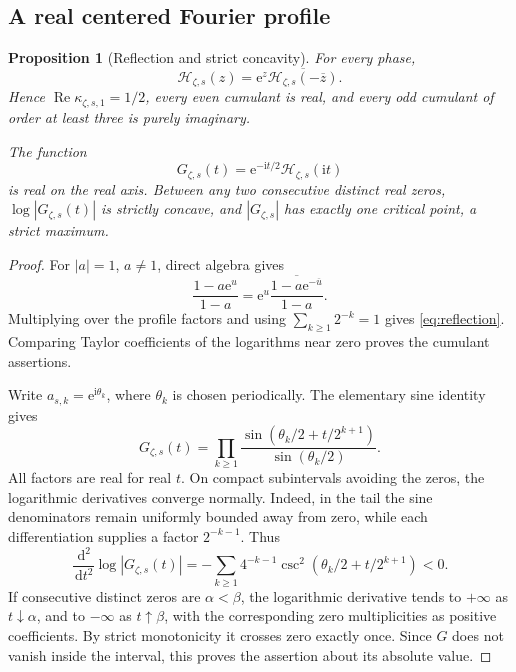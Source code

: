 \documentclass[11pt,letterpaper]{article}
\numberwithin{equation}{section}
\newtheorem{proposition}[theorem]{Proposition}
\theoremstyle{definition}
\theoremstyle{remark}
\newcommand{\dd}{\,\mathrm d}
\newcommand{\ii}{\mathrm i}
\newcommand{\Hp}{\mathcal H}
\newcommand{\e}{\mathrm e}
\begin{document}
\subsection{A real centered Fourier profile}
\begin{proposition}[Reflection and strict concavity]
For every phase,
\begin{equation}
 \Hp_{\zeta,s}(z)=\e^z\overline{\Hp_{\zeta,s}(-\overline z)}.
 \label{eq:reflection}
\end{equation}
Hence \(\operatorname{Re}\kappa_{\zeta,s,1}=1/2\), every even cumulant is real, and every odd cumulant of order at least three is purely imaginary.

The function
\begin{equation}
 G_{\zeta,s}(t)=\e^{-\ii t/2}\Hp_{\zeta,s}(\ii t)
 \label{eq:centeredG}
\end{equation}
is real on the real axis. Between any two consecutive distinct real zeros, \(\log|G_{\zeta,s}(t)|\) is strictly concave, and \(|G_{\zeta,s}|\) has exactly one critical point, a strict maximum.
\end{proposition}
\begin{proof}
For \(|a|=1\), \(a\ne1\), direct algebra gives
\[
 \frac{1-a\e^u}{1-a}
 =\e^u\overline{\frac{1-a\e^{-\overline u}}{1-a}}.
\]
Multiplying over the profile factors and using \(\sum_{k\geq1}2^{-k}=1\) gives \eqref{eq:reflection}. Comparing Taylor coefficients of the logarithms near zero proves the cumulant assertions.

Write \(a_{s,k}=\e^{\ii\theta_k}\), where \(\theta_k\) is chosen periodically. The elementary sine identity gives
\begin{equation}
 G_{\zeta,s}(t)=\prod_{k\geq1}
 \frac{\sin(\theta_k/2+t/2^{k+1})}{\sin(\theta_k/2)}.
 \label{eq:sineprofile}
\end{equation}
All factors are real for real \(t\). On compact subintervals avoiding the zeros, the logarithmic derivatives converge normally. Indeed, in the tail the sine denominators remain uniformly bounded away from zero, while each differentiation supplies a factor \(2^{-k-1}\). Thus
\begin{equation}
 \frac{\dd^2}{\dd t^2}\log|G_{\zeta,s}(t)|
 =-\sum_{k\geq1}4^{-k-1}
 \csc^2(\theta_k/2+t/2^{k+1})<0.
 \label{eq:concavity}
\end{equation}
If consecutive distinct zeros are \(\alpha<\beta\), the logarithmic derivative tends to \(+\infty\) as \(t\downarrow\alpha\), and to \(-\infty\) as \(t\uparrow\beta\), with the corresponding zero multiplicities as positive coefficients. By strict monotonicity it crosses zero exactly once. Since \(G\) does not vanish inside the interval, this proves the assertion about its absolute value.
\end{proof}
\end{document}
